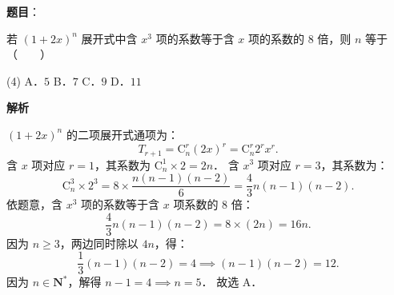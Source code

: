 \begin{answer}

\textbf{题目}：

若 $(1 + 2x)^n$ 展开式中含 $x^3$ 项的系数等于含 $x$ 项的系数的 8 倍，则 $n$ 等于\mbox{（　　）}

\begin{gkopts}(4)
\task A．$5$
\task B．$7$
\task C．$9$
\task D．$11$
\end{gkopts}

\textbf{解析}

$(1 + 2x)^n$ 的二项展开式通项为：
\nopagebreak[4]
\[
T_{r+1} = \mathrm{C}_n^r (2x)^r = \mathrm{C}_n^r 2^r x^r.
\]
含 $x$ 项对应 $r = 1$，其系数为 $\mathrm{C}_n^1 \times 2 = 2n$．
含 $x^3$ 项对应 $r = 3$，其系数为：
\nopagebreak[4]
\[
\mathrm{C}_n^3 \times 2^3 = 8 \times \frac{n(n-1)(n-2)}{6} = \frac{4}{3}n(n-1)(n-2).
\]
依题意，含 $x^3$ 项的系数等于含 $x$ 项系数的 8 倍：
\nopagebreak[4]
\[
\frac{4}{3}n(n-1)(n-2) = 8 \times (2n) = 16n.
\]
因为 $n \geqslant 3$，两边同时除以 $4n$，得：
\nopagebreak[4]
\[
\frac{1}{3}(n-1)(n-2) = 4 \implies (n-1)(n-2) = 12.
\]
因为 $n \in \mathbf{N}^*$，解得 $n - 1 = 4 \implies n = 5$．
故选 A．


\end{answer}
